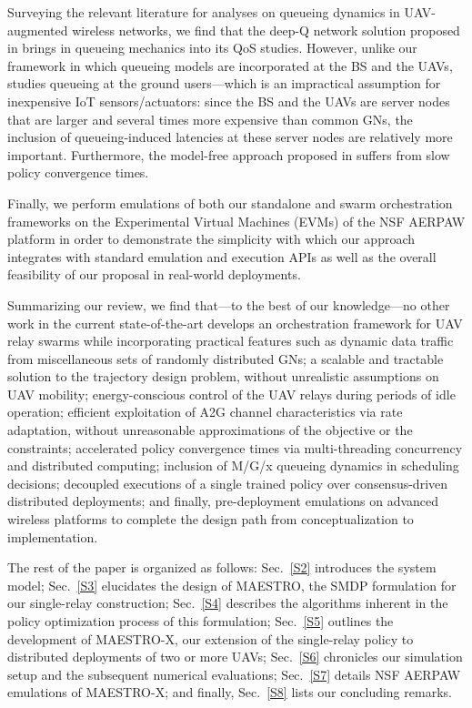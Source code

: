 \documentclass[12pt, draftcls, onecolumn]{IEEEtran}
\theoremstyle{plain}
\theoremstyle{definition}
\theoremstyle{remark}
\begin{document}
Surveying the relevant literature for analyses on queueing dynamics in UAV-augmented wireless networks, we find that the deep-Q network solution proposed in \cite{DQNPositioning} brings in queueing mechanics into its QoS studies. However, unlike our framework in which queueing models are incorporated at the BS and the UAVs, \cite{DQNPositioning} studies queueing at the ground users---which is an impractical assumption for inexpensive IoT sensors/actuators: since the BS and the UAVs are server nodes that are larger and several times more expensive than common GNs, the inclusion of queueing-induced latencies at these server nodes are relatively more important. Furthermore, the model-free approach proposed in \cite{DQNPositioning} suffers from slow policy convergence times.

Finally, we perform emulations of both our standalone and swarm orchestration frameworks on the Experimental Virtual Machines (EVMs) of the NSF AERPAW platform \cite{AERPAW} in order to demonstrate the simplicity with which our approach integrates with standard emulation and execution APIs as well as the overall feasibility of our proposal in real-world deployments.

Summarizing our review, we find that---to the best of our knowledge---no other work in the current state-of-the-art develops an orchestration framework for UAV relay swarms while incorporating practical features such as dynamic data traffic from miscellaneous sets of randomly distributed GNs; a scalable and tractable solution to the trajectory design problem, without unrealistic assumptions on UAV mobility; energy-conscious control of the UAV relays during periods of idle operation; efficient exploitation of A2G channel characteristics via rate adaptation, without unreasonable approximations of the objective or the constraints; accelerated policy convergence times via multi-threading concurrency and distributed computing; inclusion of M/G/x queueing dynamics in scheduling decisions; decoupled executions of a single trained policy over consensus-driven distributed deployments; and finally, pre-deployment emulations on advanced wireless platforms to complete the design path from conceptualization to implementation.

The rest of the paper is organized as follows: Sec.~\ref{S2} introduces the system model; Sec.~\ref{S3} elucidates the design of MAESTRO, the SMDP formulation for our single-relay construction; Sec.~\ref{S4} describes the algorithms inherent in the policy optimization process of this formulation; Sec.~\ref{S5} outlines the development of MAESTRO-X, our extension of the single-relay policy to distributed deployments of two or more UAVs; Sec.~\ref{S6} chronicles our simulation setup and the subsequent numerical evaluations; Sec.~\ref{S7} details NSF AERPAW emulations of MAESTRO-X; and finally, Sec.~\ref{S8} lists our concluding remarks.
\vspace{-4mm}
\end{document}
